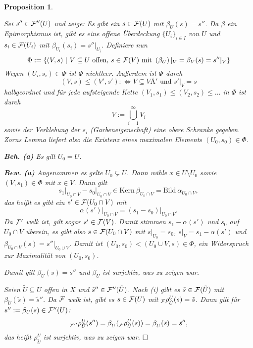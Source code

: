 \documentclass[11pt]{book}
\newtheorem{proposition}[theorem]{Proposition}
\theoremstyle{nonumberbreak}
\newenvironment{pr}[1][]{\ifthenelse{\equal{#1}{}}{\proof}{\proof[#1]}\rm}{\endproof}
\newcommand{\bild}{\mathrm{Bild}\ }
\newcommand{\kernel}{\mathrm{Kern}\ }
\begin{document}
\begin{spacing}{1.4}
\begin{proposition}
\begin{pr}
\begin{compactenum}
\item Sei $s'' \in \mathcal{F}''(U)$ und zeige: Es gibt ein $s\in \mathcal{F}(U)$ mit $\beta_U(s)=s''$. Da $\beta$ ein Epimorphismus ist, gibt es eine offene Überdeckung $\{U_i\}_{i \in I}$ von $U$ und $s_i \in \mathcal{F}(U_i)$ mit $\beta_{U_i}(s_i) = s''\vert_{U_i}$. Definiere nun 
$$\Phi:= \{ (V,s) \ \vert \ V \subseteq U \textrm{ offen, } s \in \mathcal{F}(V) \textrm{ mit } \left(\beta_U\right)\vert_V=\beta_V(s) = s''\vert_V \}$$
Wegen $(U_i, s_i) \in \Phi$ ist $\Phi$ nichtleer. Außerdem ist $\Phi$ durch 
$$(V,s) \leqslant (V',s') :\Longleftrightarrow V \subseteq VÄ' \textrm{ und } s'\vert_V = s$$
halbgeordnet und für jede aufsteigende Kette $(V_1,s_1) \leqslant (V_2, s_2) \leqslant \ldots$ in $\Phi$ ist durch 
$$V:= \bigcup_{i=1}^{\infty} V_i$$
sowie der Verklebung der $s_i$ (Garbeneigenschaft) eine obere Schranke gegeben. Zorns Lemma liefert also die Existenz eines maximalen Elements $(U_0, s_0) \in \Phi$. 
\begin{compactenum}
\item[\textbf{Beh. (a)}] Es gilt $U_0 = U$.
\item[\textbf{Bew. (a)}] Angenommen es gelte $U_0 \subsetneq U$. Dann wähle $x \in U \setminus U_0$ sowie $(V,s_1) \in \Phi$ mit $x \in V$. Dann gilt 
$$s_1 \vert_{U_0 \cap V} - s_0 \vert_{U_0 \cap V} \in \kernel \beta_{U_0 \cap V} = \bild \alpha_{U_0\cap V},$$
das heißt es gibt ein $s' \in \mathcal{F}(U_0 \cap V)$ mit 
$$\alpha(s') \vert_{U_0 \cap V} = (s_1 - s_0) \vert_{U_0 \cap V}.$$
Da $\mathcal{F}'$ welk ist, gilt sogar $s' \in \mathcal{F}(V)$. Damit stimmen $s_1 - \alpha(s')$ und $s_0$ auf $U_0 \cap V$ überein, es gibt also $s \in \mathcal{F}(U_0 \cap V)$ mit $s\vert_{U_0} = s_0$, $s\vert_V = s_1 - \alpha(s')$ und $\beta_{U_0 \cap V}(s) = s''\vert_{U_0 \cup V}$. Damit ist $ (U_0, s_0) <(U_0 \cup V, s) \in \Phi$, ein Widerspruch zur Maximalität von $(U_0, s_0)$.

\end{compactenum}
Damit gilt $\beta_U(s) = s''$ und $\beta_U$ ist surjektiv, was zu zeigen war.


\item Seien $\tilde{U} \subseteq U$ offen in $X$ und $\tilde{s}'' \in \mathcal{F}''(\tilde{U})$. Nach (i) gibt es $\tilde{s} \in \mathcal{F}(\tilde{U})$ mit $\beta_{\tilde{U}}(\tilde{s}) = \tilde{s}''$. Da $\mathcal{F}$ welk ist, gibt es $s \in \mathcal{F}(U)$ mit $_{\mathcal{F}}\rho^{U}_{\tilde{U}}(s) = \tilde{s}$. Dann gilt für $s'':= \beta_U(s) \in \mathcal{F}''(U)$:
$$_{\mathcal{F}''}\rho^{U}_{\tilde{U}}(s'') = \beta_{\tilde{U}}(_{\mathcal{F}}\rho^{U}_{\tilde{U}}(s)) = \beta_{\tilde{U}}(\tilde{s}) = \tilde{s}'',$$
das heißt $\rho^{U}_{\tilde{U}}$ ist surjektiv, was zu zeigen war. $\hfill \Box$
\end{compactenum}



\end{pr}
\end{proposition}
\end{spacing}
\end{document}
